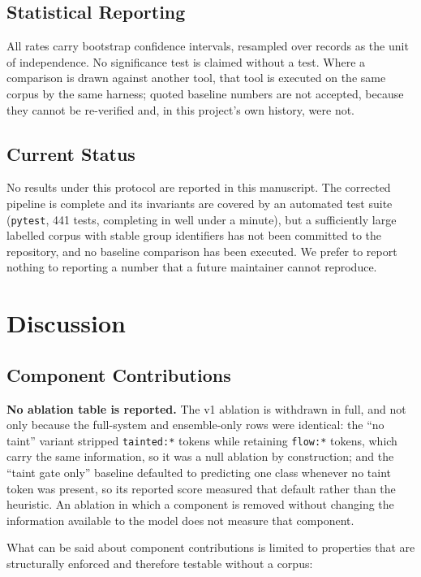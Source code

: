 \documentclass[12pt,a4paper]{article}
\begin{document}
\subsection{Statistical Reporting}

All rates carry bootstrap confidence intervals, resampled over records as the unit
of independence. No significance test is claimed without a test. Where a
comparison is drawn against another tool, that tool is executed on the same corpus
by the same harness; quoted baseline numbers are not accepted, because they cannot
be re-verified and, in this project's own history, were not.

\subsection{Current Status}

No results under this protocol are reported in this manuscript. The corrected
pipeline is complete and its invariants are covered by an automated test suite
(\texttt{pytest}, 441 tests, completing in well under a minute), but a
sufficiently large labelled corpus with stable group identifiers has not been
committed to the repository, and no baseline comparison has been executed. We
prefer to report nothing to reporting a number that a future maintainer cannot
reproduce.

\section{Discussion}
\label{sec:discussion}

\subsection{Component Contributions}

\textbf{No ablation table is reported.} The v1 ablation is withdrawn in full, and
not only because the full-system and ensemble-only rows were identical: the
``no taint'' variant stripped \texttt{tainted:*} tokens while retaining
\texttt{flow:*} tokens, which carry the same information, so it was a null
ablation by construction; and the ``taint gate only'' baseline defaulted to
predicting one class whenever no taint token was present, so its reported score
measured that default rather than the heuristic. An ablation in which a component
is removed without changing the information available to the model does not
measure that component.

What can be said about component contributions is limited to properties that are
structurally enforced and therefore testable without a corpus:
\end{document}
